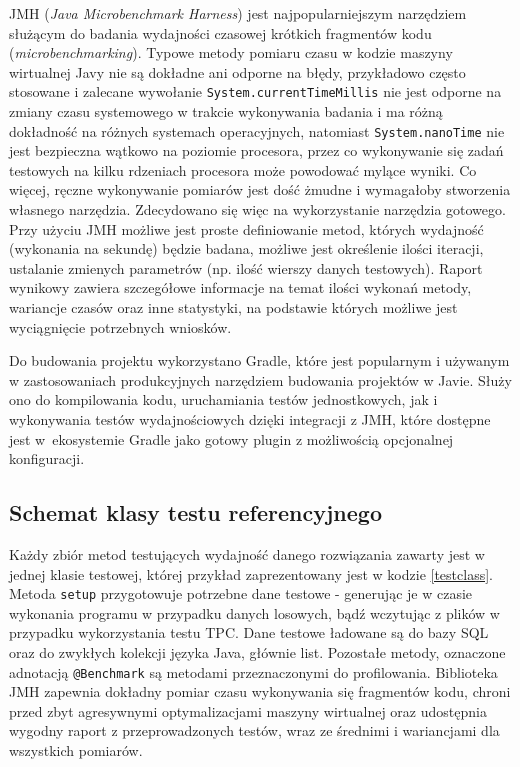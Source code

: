 \documentclass[12pt,twoside,openright]{extarticle}
\begin{document}
    JMH (\textit{Java Microbenchmark Harness}) jest najpopularniejszym narzędziem służącym do badania wydajności czasowej krótkich fragmentów kodu (\textit{microbenchmarking}). Typowe metody pomiaru czasu w kodzie maszyny wirtualnej Javy nie są dokładne ani odporne na błędy, przykładowo często stosowane i zalecane wywołanie \texttt{System.currentTimeMillis} nie jest odporne na zmiany czasu systemowego w trakcie wykonywania badania i ma różną dokładność na różnych systemach operacyjnych, natomiast \texttt{System.nanoTime} nie jest bezpieczna wątkowo na poziomie procesora, przez co wykonywanie się zadań testowych na kilku rdzeniach procesora może powodować mylące wyniki. Co więcej, ręczne wykonywanie pomiarów jest dość żmudne i wymagałoby stworzenia własnego narzędzia. Zdecydowano się więc na wykorzystanie narzędzia gotowego. Przy użyciu JMH możliwe jest proste definiowanie metod, których wydajność (wykonania na sekundę) będzie badana, możliwe jest określenie ilości iteracji, ustalanie zmienych parametrów (np. ilość wierszy danych testowych). Raport wynikowy zawiera szczegółowe informacje na temat ilości wykonań metody, wariancje czasów oraz inne statystyki, na podstawie których możliwe jest wyciągnięcie potrzebnych wniosków.

    Do budowania projektu wykorzystano Gradle, które jest popularnym i używanym w zastosowaniach produkcyjnych narzędziem budowania projektów w Javie. Służy ono do kompilowania kodu, uruchamiania testów jednostkowych, jak i wykonywania testów wydajnościowych dzięki integracji z JMH, które dostępne jest w~ekosystemie Gradle jako gotowy plugin z możliwością opcjonalnej konfiguracji.

\subsection{Schemat klasy testu referencyjnego}


    Każdy zbiór metod testujących wydajność danego rozwiązania zawarty jest w jednej klasie testowej, której przykład zaprezentowany jest w kodzie \ref{testclass}. Metoda \texttt{setup} przygotowuje potrzebne dane testowe - generując je w czasie wykonania programu w przypadku danych losowych, bądź wczytując z plików w przypadku wykorzystania testu TPC. Dane testowe ładowane są do bazy SQL oraz do zwykłych kolekcji języka Java, głównie list. Pozostałe metody, oznaczone adnotacją \texttt{@Benchmark} są metodami przeznaczonymi do profilowania. Biblioteka JMH zapewnia dokładny pomiar czasu wykonywania się fragmentów kodu, chroni przed zbyt agresywnymi optymalizacjami maszyny wirtualnej oraz udostępnia wygodny raport z przeprowadzonych testów, wraz ze średnimi i wariancjami dla wszystkich pomiarów.
\end{document}
